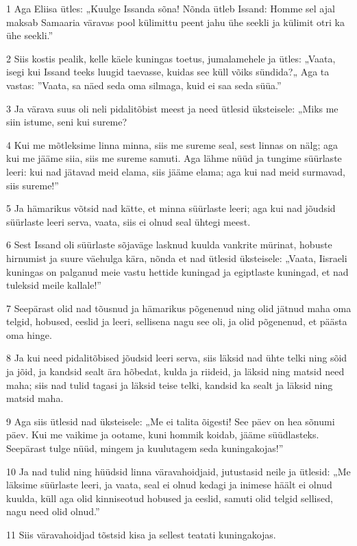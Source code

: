 \par 1 Aga Eliisa ütles: „Kuulge Issanda sõna! Nõnda ütleb Issand: Homme sel ajal maksab Samaaria väravas pool külimittu peent jahu ühe seekli ja külimit otri ka ühe seekli.”
\par 2 Siis kostis pealik, kelle käele kuningas toetus, jumalamehele ja ütles: „Vaata, isegi kui Issand teeks luugid taevasse, kuidas see küll võiks sündida?„ Aga ta vastas: ”Vaata, sa näed seda oma silmaga, kuid ei saa seda süüa.”
\par 3 Ja värava suus oli neli pidalitõbist meest ja need ütlesid üksteisele: „Miks me siin istume, seni kui sureme?
\par 4 Kui me mõtleksime linna minna, siis me sureme seal, sest linnas on nälg; aga kui me jääme siia, siis me sureme samuti. Aga lähme nüüd ja tungime süürlaste leeri: kui nad jätavad meid elama, siis jääme elama; aga kui nad meid surmavad, siis sureme!”
\par 5 Ja hämarikus võtsid nad kätte, et minna süürlaste leeri; aga kui nad jõudsid süürlaste leeri serva, vaata, siis ei olnud seal ühtegi meest.
\par 6 Sest Issand oli süürlaste sõjaväge lasknud kuulda vankrite mürinat, hobuste hirnumist ja suure väehulga kära, nõnda et nad ütlesid üksteisele: „Vaata, Iisraeli kuningas on palganud meie vastu hettide kuningad ja egiptlaste kuningad, et nad tuleksid meile kallale!”
\par 7 Seepärast olid nad tõusnud ja hämarikus põgenenud ning olid jätnud maha oma telgid, hobused, eeslid ja leeri, sellisena nagu see oli, ja olid põgenenud, et päästa oma hinge.
\par 8 Ja kui need pidalitõbised jõudsid leeri serva, siis läksid nad ühte telki ning sõid ja jõid, ja kandsid sealt ära hõbedat, kulda ja riideid, ja läksid ning matsid need maha; siis nad tulid tagasi ja läksid teise telki, kandsid ka sealt ja läksid ning matsid maha.
\par 9 Aga siis ütlesid nad üksteisele: „Me ei talita õigesti! See päev on hea sõnumi päev. Kui me vaikime ja ootame, kuni hommik koidab, jääme süüdlasteks. Seepärast tulge nüüd, mingem ja kuulutagem seda kuningakojas!”
\par 10 Ja nad tulid ning hüüdsid linna väravahoidjaid, jutustasid neile ja ütlesid: „Me läksime süürlaste leeri, ja vaata, seal ei olnud kedagi ja inimese häält ei olnud kuulda, küll aga olid kinniseotud hobused ja eeslid, samuti olid telgid sellised, nagu need olid olnud.”
\par 11 Siis väravahoidjad tõstsid kisa ja sellest teatati kuningakojas.
